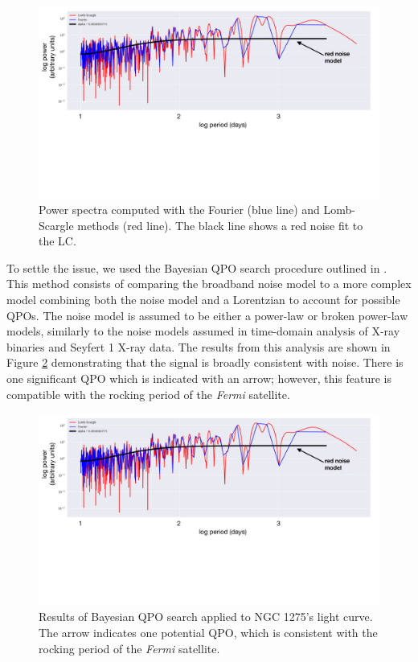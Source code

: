 \documentclass{iau}
\begin{document}
\begin{figure}[h]
\begin{center}
\includegraphics[width=0.8\linewidth, page=1, trim=0 300 150 0,clip=true]{plots.pdf} 
\caption{Power spectra computed with the Fourier (blue line) and  Lomb-Scargle methods (red line). The black line shows a red noise fit to the LC.  }
\label{fourier}
\end{center}
\end{figure}

To settle the issue, we used the Bayesian QPO search procedure outlined in \cite{Huppenkothen2013}. This method consists of comparing the broadband noise model to a more complex model combining both the noise model and a Lorentzian to account for possible QPOs. The noise model is assumed to be either a power-law or broken power-law models, similarly to the noise models assumed in time-domain analysis of X-ray binaries and Seyfert 1 X-ray data. The results from this analysis are shown in Figure \ref{bayes} demonstrating that the signal is broadly consistent with noise. There is one significant QPO which is indicated with an arrow; however, this feature is compatible with the rocking period of the \textit{Fermi} satellite.

\begin{figure}[h]
\begin{center}
\includegraphics[width=\linewidth, page=2, trim=50 0 50 0,clip=true]{plots.pdf} 
\caption{Results of Bayesian QPO search applied to NGC 1275's light curve. The arrow indicates one potential QPO, which is consistent with the rocking period of the \textit{Fermi} satellite. }
\label{bayes}
\end{center}
\end{figure}
\end{document}
